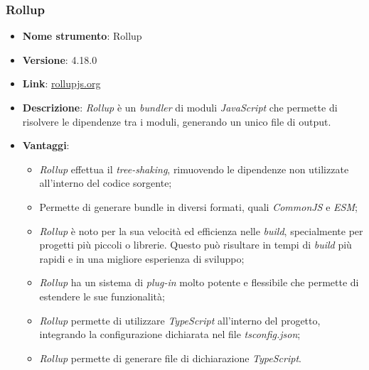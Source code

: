 \subsubsection{Rollup}
\begin{itemize}
      \item \textbf{Nome strumento}: Rollup
      \item \textbf{Versione}: 4.18.0
      \item \textbf{Link}: \href{https://rollupjs.org/}{rollupjs.org}
      \item \textbf{Descrizione}: \textit{Rollup} è un \textit{\gls{bundler}\glox} di moduli \textit{JavaScript} che permette di risolvere le dipendenze tra i moduli, generando un unico file di output.
      \item \textbf{Vantaggi}:
            \begin{itemize}
                  \item \textit{Rollup} effettua il \textit{\gls{tree-shaking}\glox}, rimuovendo le dipendenze non utilizzate all'interno del codice sorgente;
                  \item Permette di generare bundle in diversi formati, quali \textit{CommonJS} e \textit{ESM};
                  \item \textit{Rollup} è noto per la sua velocità ed efficienza nelle \textit{build}, specialmente per progetti più piccoli o librerie.
                        Questo può risultare in tempi di \textit{build} più rapidi e in una migliore esperienza di sviluppo;
                  \item \textit{Rollup} ha un sistema di \textit{plug-in} molto potente e flessibile che permette di estendere le sue funzionalità;
                  \item \textit{Rollup} permette di utilizzare \textit{TypeScript} all'interno del progetto, integrando la configurazione dichiarata nel file \textit{tsconfig.json};
                  \item \textit{Rollup} permette di generare file di dichiarazione \textit{TypeScript}.
            \end{itemize}
\end{itemize}

